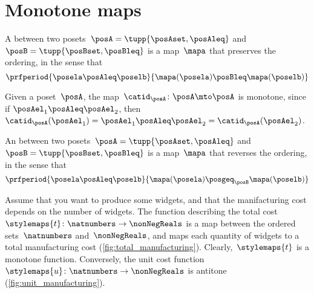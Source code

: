 
\section{Monotone maps}\label{sec:monotonicity-monotone-maps}


\begin{definition}
	\label{def:monotone}
	A \emph{} between two posets~$\posA=\tupp{\posAset, \posAleq}$ and~$\posB=\tupp{\posBset, \posBleq}$ is a map~$\mapa$ that preserves the ordering, in the sense that
	\begin{equation}
		\prfperiod{
			\posela \posAleq \poselb
		}{
			\mapa(\posela) \posBleq \mapa(\poselb)
		}
	\end{equation}
\end{definition}

\begin{remark}
	Given a poset~$\posA$, the map~$\catid_{\posA}\colon \posA \mto \posA$ is monotone, since if $\posAel_1\posAleq \posAel_2$, then $\catid_{\posA}(\posAel_1)=\posAel_1 \posAleq  \posAel_2 =  \catid_{\posA}(\posAel_2 )$.

\end{remark}

\begin{definition}
	\label{def:antitone}
	An \emph{} between two posets~$\posA=\tupp{\posAset, \posAleq}$ and~$\posB=\tupp{\posBset, \posBleq}$ is a map~$\mapa$ that reverses the ordering, in the sense that
	\begin{equation}
		\prfperiod{
			\posela \posAleq \poselb
		}{
			\mapa(\posela) \posgeq_\posB \mapa(\poselb)
		}
	\end{equation}
\end{definition}

\begin{example}
	Assume that you want to produce some widgets, and that the manifacturing cost depends on the number of widgets.
	The function describing the total cost~$\stylemaps{t}\colon \natnumbers\to \nonNegReals$ is a map between the ordered sets~$\natnumbers$ and~$\nonNegReals$, and maps each quantity of widgets to a total manufacturing cost (\cref{fig:total_manufacturing}).
	Clearly,~$\stylemaps{t}$ is a monotone function.
	Conversely, the unit cost function~$\stylemaps{u}\colon \natnumbers\to \nonNegReals$ is antitone (\cref{fig:unit_manufacturing}).
\end{example}

